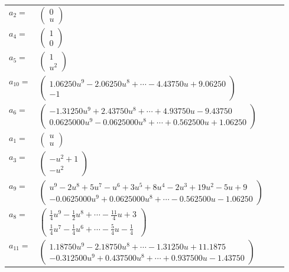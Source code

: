 \documentclass[1p]{elsarticle_modified}
\theoremstyle{definition}
\begin{document}
\begin{tabular}{m{7pt} m{180pt} m{7pt} m{180pt} }
\flushright $a_{2}=$&$\begin{pmatrix}0\\u\end{pmatrix}$ \\
\flushright $a_{4}=$&$\begin{pmatrix}1\\0\end{pmatrix}$ \\
\flushright $a_{5}=$&$\begin{pmatrix}1\\u^2\end{pmatrix}$ \\
\flushright $a_{10}=$&$\begin{pmatrix}1.06250 u^{9}-2.06250 u^{8}+\cdots-4.43750 u+9.06250\\-1\end{pmatrix}$ \\
\flushright $a_{6}=$&$\begin{pmatrix}-1.31250 u^{9}+2.43750 u^{8}+\cdots+4.93750 u-9.43750\\0.0625000 u^{9}-0.0625000 u^{8}+\cdots+0.562500 u+1.06250\end{pmatrix}$ \\
\flushright $a_{1}=$&$\begin{pmatrix}u\\u\end{pmatrix}$ \\
\flushright $a_{3}=$&$\begin{pmatrix}- u^2+1\\- u^2\end{pmatrix}$ \\
\flushright $a_{9}=$&$\begin{pmatrix}u^9-2 u^8+5 u^7- u^6+3 u^5+8 u^4-2 u^3+19 u^2-5 u+9\\-0.0625000 u^{9}+0.0625000 u^{8}+\cdots-0.562500 u-1.06250\end{pmatrix}$ \\
\flushright $a_{8}=$&$\begin{pmatrix}\frac{1}{4} u^9-\frac{1}{2} u^8+\cdots-\frac{11}{4} u+3\\\frac{1}{4} u^7-\frac{1}{4} u^6+\cdots-\frac{5}{4} u-\frac{1}{4}\end{pmatrix}$ \\
\flushright $a_{11}=$&$\begin{pmatrix}1.18750 u^{9}-2.18750 u^{8}+\cdots-1.31250 u+11.1875\\-0.312500 u^{9}+0.437500 u^{8}+\cdots+0.937500 u-1.43750\end{pmatrix}$ \\

\end{tabular}
\end{document}
